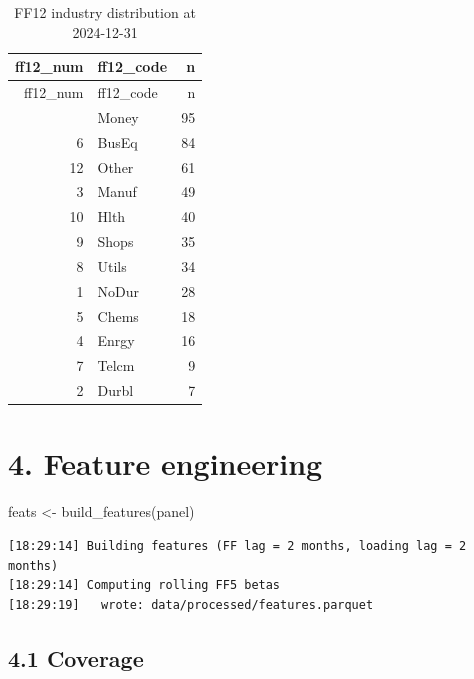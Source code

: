 \documentclass[
  letterpaper,
  DIV=11,
  numbers=noendperiod]{scrartcl}
\newenvironment{Shaded}{\begin{snugshade}}{\end{snugshade}}
\newcommand{\FunctionTok}[1]{\textcolor[rgb]{0.28,0.35,0.67}{#1}}
\newcommand{\NormalTok}[1]{\textcolor[rgb]{0.00,0.23,0.31}{#1}}
\newcommand{\OtherTok}[1]{\textcolor[rgb]{0.00,0.23,0.31}{#1}}
\begin{document}
\begin{longtable}[]{@{}rlr@{}}
\caption{FF12 industry distribution at 2024-12-31}\tabularnewline
\toprule\noalign{}
ff12\_num & ff12\_code & n \\
\midrule\noalign{}
\endfirsthead
\toprule\noalign{}
ff12\_num & ff12\_code & n \\
\midrule\noalign{}
\endhead
\bottomrule\noalign{}
\endlastfoot
11 & Money & 95 \\
6 & BusEq & 84 \\
12 & Other & 61 \\
3 & Manuf & 49 \\
10 & Hlth & 40 \\
9 & Shops & 35 \\
8 & Utils & 34 \\
1 & NoDur & 28 \\
5 & Chems & 18 \\
4 & Enrgy & 16 \\
7 & Telcm & 9 \\
2 & Durbl & 7 \\
\end{longtable}

\section{4. Feature engineering}\label{feature-engineering}

\begin{Shaded}
\begin{Highlighting}[]
\NormalTok{feats }\OtherTok{\textless{}{-}} \FunctionTok{build\_features}\NormalTok{(panel)}
\end{Highlighting}
\end{Shaded}

\begin{verbatim}
[18:29:14] Building features (FF lag = 2 months, loading lag = 2 months)
[18:29:14] Computing rolling FF5 betas
[18:29:19]   wrote: data/processed/features.parquet
\end{verbatim}

\subsection{4.1 Coverage}\label{coverage}
\end{document}
